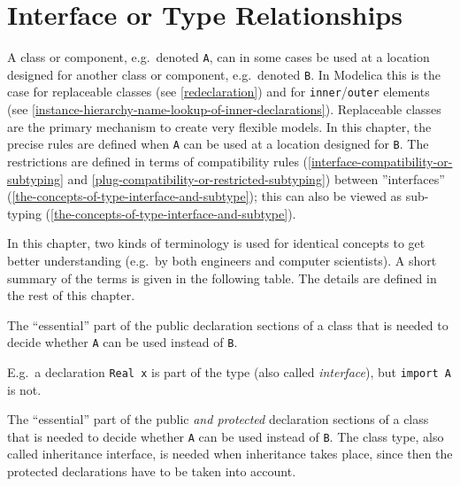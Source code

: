 \chapter{Interface or Type Relationships}

A class or component, e.g.\ denoted \lstinline!A!, can in some cases be used at a
location designed for another class or component, e.g.\ denoted \lstinline!B!. In
Modelica this is the case for replaceable classes (see \autoref{redeclaration}) and
for \lstinline!inner!/\lstinline!outer! elements (see \autoref{instance-hierarchy-name-lookup-of-inner-declarations}).
Replaceable classes are the
primary mechanism to create very flexible models. In this chapter, the
precise rules are defined when \lstinline!A! can be used at a location designed for
\lstinline!B!. The restrictions are defined in terms of compatibility rules
(\autoref{interface-compatibility-or-subtyping} and \autoref{plug-compatibility-or-restricted-subtyping}) between ''interfaces'' (\autoref{the-concepts-of-type-interface-and-subtype}); this can
also be viewed as sub-typing (\autoref{the-concepts-of-type-interface-and-subtype}).

In this chapter, two kinds of terminology is used for identical concepts
to get better understanding (e.g.\ by both engineers and computer
scientists). A short summary of the terms is given in the following
table. The details are defined in the rest of this chapter.

\begin{definition}
The ``essential'' part of the public declaration sections of a class
that is needed to decide whether \lstinline!A! can be used instead of \lstinline!B!.
\par
\begin{nonnormative*}
E.g.\ a declaration \lstinline!Real x! is part of the type (also called \emph{interface}), but \lstinline!import A! is not.
\end{nonnormative*}
\end{definition}

\begin{definition}
The ``essential'' part of the public \emph{and protected} declaration sections of a class that is needed to decide whether \lstinline!A! can be used instead of \lstinline!B!. The class type, also
called inheritance interface, is needed when inheritance takes place, since then the protected declarations have to be taken into account.
\end{definition}

